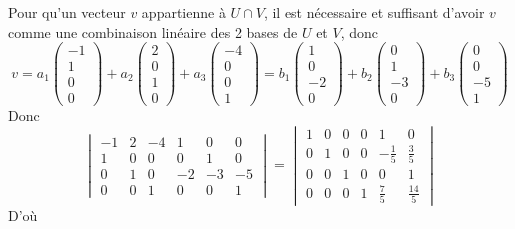 \documentclass[]{book}
\theoremstyle{definition}
\begin{document}
Pour qu'un vecteur $v$ appartienne \`a $U \cap V$, il est n\'ecessaire et suffisant d'avoir $v$ comme une combinaison lin\'eaire des 2 bases de $U$ et $V$, donc
$$
v= 
a_1\begin{pmatrix}-1\\1\\0\\0\end{pmatrix}+a_2\begin{pmatrix}2\\0\\1\\0\end{pmatrix}+a_3\begin{pmatrix}-4\\0\\0\\1\end{pmatrix} 
= b_1\begin{pmatrix}1\\0\\-2\\0\end{pmatrix}+b_2\begin{pmatrix}0\\1\\-3\\0\end{pmatrix}+b_3\begin{pmatrix}0\\0\\-5\\1\end{pmatrix}
$$
Donc
$$
\begin{vmatrix} -1&2&-4&1&0&0 \\ 1&0&0&0&1&0 \\ 0&1&0&-2&-3&-5 \\ 0&0&1&0&0&1 \end{vmatrix} = 
\begin{vmatrix} 1&0&0&0&1&0 \\ 0&1&0&0&-\frac{1}{5}&\frac{3}{5} \\ 0&0&1&0&0&1 \\ 0&0&0&1&\frac{7}{5}&\frac{14}{5} \end{vmatrix}
$$
D'o\`u
\end{document}
